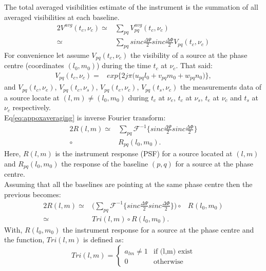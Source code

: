 The total  averaged visibilities estimate of the instrument is the summation of all averaged visibilities at each baseline.
\begin{alignat}{2}
V^{avg}(t_c,\nu_c)\simeq&\sum_{pq} V_{pq}^{avg}(t_c, \nu_c)\\
	\simeq&\sum_{pq} sinc\frac{\Delta \Psi}{2}sinc\frac{\Delta \Phi}{2} V_{pq}(t_{c},\nu_{c})\label{eq:appoxaveraging}
\end{alignat}
For convenience let assume $V_{pq}(t_{c},\nu_{c})$ the visibility of a source at the phase centre (coordinates $(l_0,m_0)$) during the 
time $t_c$ at $\nu_c$. That said: 
\begin{eqnarray}
 V_{pq}(t_c, \nu_c)=& exp\bigg\{2j\pi\big(u_{pq}l_0+v_{pq}m_0+ w_{pq}n_0\big)\bigg\},
\end{eqnarray}
and $V_{pq}(t_{c},\nu_{e})$, $V_{pq}(t_{c},\nu_{s})$, $V_{pq}(t_{e},\nu_{c})$, $V_{pq}(t_{s},\nu_{c})$ the measurements data of a source 
locate at $(l,m)\neq(l_0,m_0)$ during $t_c$ at $\nu_e$, $t_c$ at $\nu_s$, $t_e$ at $\nu_c$ and  $t_s$ at $\nu_c$ respectively.\\
Eq\ref{eq:appoxaveraging} is inverse Fourier transform:
\begin{alignat}{2}
R(l,m)\simeq& \sum_{pq}\mathcal{F}^{-1}\bigg\{sinc\frac{\Delta \Psi}{2}sinc\frac{\Delta \Phi}{2}\bigg\}\\
	\circ& R_{pq}(l_0,m_0).
\end{alignat}
Here, $R(l,m)$ is the instrument response (PSF) for a source located at $(l,m)$ and $R_{pq}(l_0,m_0)$ the response of the baseline 
$(p,q)$ for a source at the phase centre.\\
Assuming that all the baselines are pointing at the same phase centre then the previous becomes:
\begin{alignat}{2}
R(l,m)\simeq&\bigg(\sum_{pq}\mathcal{F}^{-1}\bigg\{sinc\frac{\Delta \Psi}{2}sinc\frac{\Delta \Phi}{2}\bigg\}\bigg)
	\circ& R_{}(l_0,m_0)\\
      \simeq& Tri(l,m)\circ R(l_0,m_0).\label{eqtota}
\end{alignat}
With, $R(l_0,m_0)$ the instrument response for a source at the phase centre and the function, $Tri(l,m)$ is defined as:
\begin{equation*}
Tri(l,m)=\left\{
\begin{array}{rl}
a_{lm}\neq 1 & \mbox{if (l,m) exist} \\
0 & \mbox{otherwise}
\end{array}\right.
\end{equation*}

